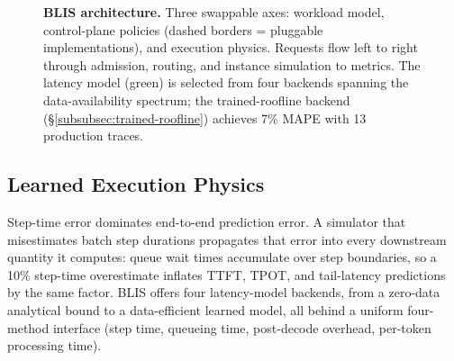 \documentclass[11pt]{article}
\theoremstyle{plain} %
\theoremstyle{definition} %
\theoremstyle{remark} %
\numberwithin{equation}{section}
\begin{document}
\begin{figure}[t]
\caption{\textbf{BLIS architecture.}
  Three swappable axes: workload model, control-plane policies (dashed borders =
  pluggable implementations), and execution physics.
  Requests flow left to right through admission, routing, and instance simulation to
  metrics.
  The latency model (green) is selected from four backends spanning the
  data-availability spectrum; the trained-roofline backend (\S\ref{subsubsec:trained-roofline})
  achieves 7\% MAPE with 13 production traces.}
\label{fig:blis-arch}
\end{figure}

\subsection{Learned Execution Physics}
\label{subsec:design-latency}

Step-time error dominates end-to-end prediction error.
A simulator that misestimates batch step durations propagates that error into
every downstream quantity it computes: queue wait times accumulate over step
boundaries, so a 10\% step-time overestimate inflates TTFT, TPOT, and tail-latency
predictions by the same factor.
BLIS offers four latency-model backends, from a zero-data analytical bound to a
data-efficient learned model, all behind a uniform four-method interface
(step time, queueing time, post-decode overhead, per-token processing time).
\end{document}
